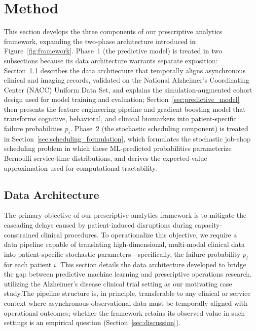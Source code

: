 \documentclass[11pt,a4paper]{article}
\begin{document}
\newpage
\section{Method}

This section develops the three components of our prescriptive analytics framework, expanding the two-phase architecture introduced in Figure~\ref{fig:framework}. Phase~1 (the predictive model) is treated in two subsections because its data architecture warrants separate exposition: Section~\ref{sec:data_architecture} describes the data architecture that temporally aligns asynchronous clinical and imaging records, validated on the National Alzheimer's Coordinating Center (NACC) Uniform Data Set, and explains the simulation-augmented cohort design used for model training and evaluation; Section~\ref{sec:predictive_model} then presents the feature engineering pipeline and gradient boosting model that transforms cognitive, behavioral, and clinical biomarkers into patient-specific failure probabilities $p_i$. Phase~2 (the stochastic scheduling component) is treated in Section~\ref{sec:scheduling_formulation}, which formulates the stochastic job-shop scheduling problem in which these ML-predicted probabilities parameterize Bernoulli service-time distributions, and derives the expected-value approximation used for computational tractability.

\subsection{Data Architecture}
\label{sec:data_architecture}

The primary objective of our prescriptive analytics framework is to mitigate the cascading delays caused by patient-induced disruptions during capacity-constrained clinical procedures. To operationalize this objective, we require a data pipeline capable of translating high-dimensional, multi-modal clinical data into patient-specific stochastic parameters---specifically, the failure probability $p_i$ for each patient $i$. This section details the data architecture developed to bridge the gap between predictive machine learning and prescriptive operations research, utilizing the Alzheimer's disease clinical trial setting as our motivating case study.The pipeline structure is, in principle, transferable to any clinical or service context where asynchronous observational data must be temporally aligned with operational outcomes; whether the framework retains its observed value in such settings is an empirical question (Section~\ref{sec:discussion}).
\end{document}
